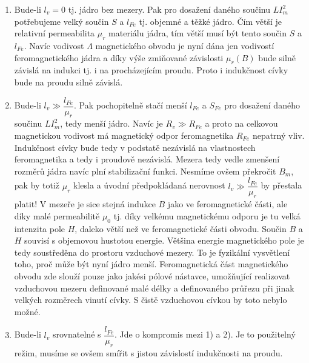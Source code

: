       \begin{enumerate}[noitemsep]
        \item Bude-li \(l_v = 0\) tj. jádro bez mezery. Pak pro dosažení daného součinu 
              \(LI_m^2\) potřebujeme velký součin \(S\) a \(l_{Fe}\) tj. objemné a těžké jádro. Čím 
              větší je relativní permeabilita \(\mu_r\) materiálu jádra, tím větší musí být tento 
              součin \(S\) a \(l_{Fe}\). Navíc vodivost \(\Lambda\) magnetického obvodu je nyní 
              dána jen vodivostí feromagnetického jádra a díky výše zmiňované závislosti 
              \(\mu_r(B)\) bude silně závislá na indukci tj. i na procházejícím proudu. Proto i 
              indukčnost cívky bude na proudu silně závislá.
        \item Bude-li \(l_v\gg \dfrac{l_{Fe}}{\mu_r}\). Pak pochopitelně stačí menší \(l_{Fe}\) a 
              \(S_{Fe}\) pro dosažení daného součinu \(LI_m^2\), tedy menší jádro. Navíc je 
              \(R_v\gg R_{Fe}\) a proto na celkovou magnetickou vodivost má magnetický odpor
              feromagnetika \(R_{Fe}\) nepatrný vliv. Indukčnost cívky bude tedy v podstatě 
              nezávislá na vlastnostech feromagnetika a tedy i proudově nezávislá. Mezera tedy 
              vedle zmenšení rozměrů jádra navíc plní stabilizační funkci. Nesmíme ovšem překročit 
              \(B_m\), pak by totiž \(\mu_r\) klesla a úvodní předpokládaná nerovnost \(l_v\gg 
              \dfrac{l_{Fe}}{\mu_r}\) by přestala platit! V mezeře je sice stejná indukce \(B\) 
              jako ve feromagnetické části, ale díky malé permeabilitě \(\mu_0\) tj. díky velkému 
              magnetickému odporu je tu velká intenzita pole \(H\), daleko větší než ve 
              feromagnetické části obvodu. Součin \(B\) a \(H\) souvisí s objemovou hustotou 
              energie. Většina energie magnetického pole je tedy soustředěna do prostoru 
              vzduchové mezery. To je fyzikální vysvětlení toho, proč může být nyní jádro menší. 
              Feromagnetická část magnetického obvodu zde slouží pouze jako jakési pólové nástavce, 
              umožňující realizovat vzduchovou mezeru definované malé délky a definovaného průřezu 
              při jinak velkých rozměrech vinutí cívky. S čistě vzduchovou cívkou by toto nebylo 
              možné.
        \item Bude-li \(l_v\) srovnatelné s \(\dfrac{l_{Fe}}{\mu_r}\). Jde o kompromis mezi 1) a 
              2). Je to použitelný režim, musíme se ovšem smířit s jistou závislostí indukčnosti na 
              proudu.
      \end{enumerate}
      
